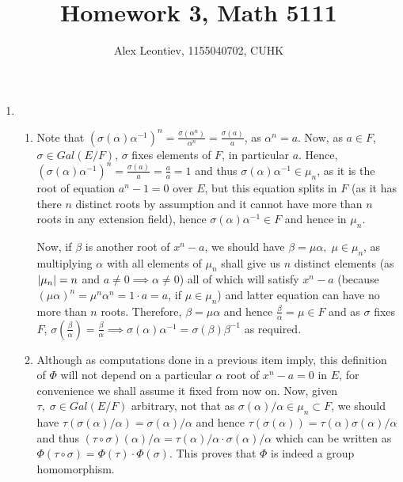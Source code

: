 \documentclass[8pt]{article} %
\title{Homework 3, Math 5111}
\author{Alex Leontiev, 1155040702, CUHK}
\begin{document}
\maketitle
\begin{enumerate}[label=\bfseries Problem \arabic*.]
	\item{
		\begin{enumerate}[label=(\arabic*).]
			\item{Note that $(\sigma(\alpha)\alpha^{-1})^n=\frac{\sigma(\alpha^n)}{\alpha^n}=\frac{\sigma(a)}{a}$, as $\alpha^n=a$. Now, as
				$a\in F$, $\sigma\in Gal(E/F)$, $\sigma$ fixes elements of $F$, in particular $a$. Hence,
				$(\sigma(\alpha)\alpha^{-1})^n=\frac{\sigma(a)}{a}=\frac{a}{a}=1$ and thus $\sigma(\alpha)\alpha^{-1}\in\mu_n$, as it is
				the root of equation $a^n-1=0$ over $E$, but this equation splits in $F$ (as it has there $n$ distinct roots by assumption and it
				cannot have more than $n$ roots in any extension field), hence $\sigma(\alpha)\alpha^{-1}\in F$ and hence in $\mu_n$.

				Now, if $\beta$ is another root of $x^n-a$, we should have $\beta=\mu\alpha,\;\mu\in\mu_n$, as multiplying $\alpha$ with all elements
				of $\mu_n$ shall give us $n$ distinct elements (as $\left|\mu_n\right|=n$ and $a\neq 0\implies\alpha\neq 0$) all of which will satisfy
				$x^n-a$ (because $(\mu\alpha)^n=\mu^n\alpha^n=1\cdot a=a$, if $\mu\in\mu_n$) and latter equation can have no more than $n$ roots.
				Therefore, $\beta=\mu\alpha$ and hence $\frac{\beta}{\alpha}=\mu\in F$ and as $\sigma$ fixes $F$, $\sigma\left(\frac{\beta}{\alpha}
				\right)=\frac{\beta}{\alpha}\implies \sigma(\alpha)\alpha^{-1}=\sigma(\beta)\beta^{-1}$ as required.
				}
			\item{Although as computations done in a previous item imply, this definition of $\Phi$ will not depend on a particular $\alpha$ root
				of $x^n-a=0$ in $E$, for convenience we shall assume it fixed from now on. Now, given $\tau,\;\sigma\in Gal(E/F)$ arbitrary,
				not that as $\sigma(\alpha)/\alpha\in\mu_n\subset F$, we should have $\tau(\sigma(\alpha)/\alpha)=\sigma(\alpha)/\alpha$ and hence
				$\tau(\sigma(\alpha))=\tau(\alpha)\sigma(\alpha)/\alpha$ and thus $(\tau\circ\sigma)(\alpha)/\alpha=\tau(\alpha)/\alpha\cdot
				\sigma(\alpha)/\alpha$ which can be written as $\Phi(\tau\circ\sigma)=\Phi(\tau)\cdot\Phi(\sigma)$. This proves that $\Phi$ is indeed
				a group homomorphism.

}
\end{enumerate}}
\end{enumerate}
\end{document}
